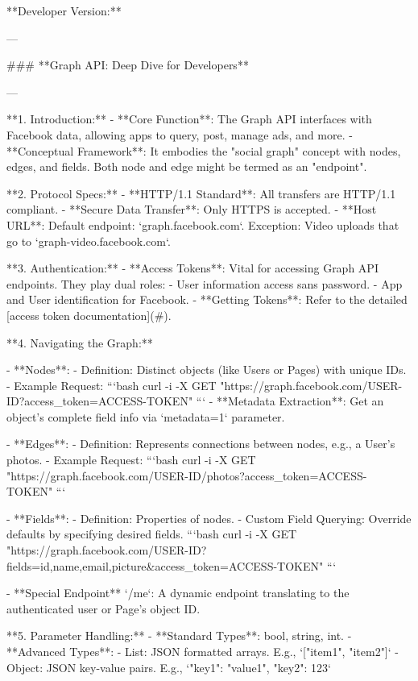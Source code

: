**Developer Version:**

---

### **Graph API: Deep Dive for Developers**

---

**1. Introduction:**  
- **Core Function**: The Graph API interfaces with Facebook data, allowing apps to query, post, manage ads, and more.
- **Conceptual Framework**: It embodies the "social graph" concept with nodes, edges, and fields. Both node and edge might be termed as an "endpoint".

**2. Protocol Specs:**
- **HTTP/1.1 Standard**: All transfers are HTTP/1.1 compliant.
- **Secure Data Transfer**: Only HTTPS is accepted.
- **Host URL**: Default endpoint: `graph.facebook.com`. Exception: Video uploads that go to `graph-video.facebook.com`.

**3. Authentication:**
- **Access Tokens**: Vital for accessing Graph API endpoints. They play dual roles:
  - User information access sans password.
  - App and User identification for Facebook.
- **Getting Tokens**: Refer to the detailed [access token documentation](#).

**4. Navigating the Graph:**

  - **Nodes**:
    - Definition: Distinct objects (like Users or Pages) with unique IDs.
    - Example Request:  
      ```bash
      curl -i -X GET "https://graph.facebook.com/USER-ID?access_token=ACCESS-TOKEN"
      ```
    - **Metadata Extraction**: Get an object’s complete field info via `metadata=1` parameter.
  
  - **Edges**:
    - Definition: Represents connections between nodes, e.g., a User’s photos.
    - Example Request:  
      ```bash
      curl -i -X GET "https://graph.facebook.com/USER-ID/photos?access_token=ACCESS-TOKEN"
      ```

  - **Fields**:
    - Definition: Properties of nodes.
    - Custom Field Querying: Override defaults by specifying desired fields. 
      ```bash
      curl -i -X GET "https://graph.facebook.com/USER-ID?fields=id,name,email,picture&access_token=ACCESS-TOKEN"
      ```

  - **Special Endpoint** `/me`: A dynamic endpoint translating to the authenticated user or Page’s object ID.

**5. Parameter Handling:**
- **Standard Types**: bool, string, int.
- **Advanced Types**:
  - List: JSON formatted arrays. E.g., `["item1", "item2"]`
  - Object: JSON key-value pairs. E.g., `{"key1": "value1", "key2": 123}`

